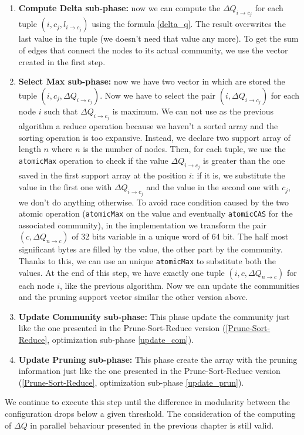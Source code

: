 \begin{enumerate}
	\item \textbf{Compute Delta sub-phase:} now we can compute the $\Delta Q_{i\rightarrow c_j}$ for each tuple $(i, c_j, l_{i \rightarrow c_j})$ using the formula \ref{delta_q}. The result overwrites the last value in the tuple (we doesn't need that value any more). To get the sum of edges that connect the nodes to its actual community, we use the vector created in the first step.
	\item \textbf{Select Max sub-phase:} now we have two vector in which are stored the tuple $(i, c_j, \Delta Q_{i\rightarrow c_j})$. Now we have to select the pair $(i, \Delta Q_{i\rightarrow c_j})$ for each node $i$ such that $\Delta Q_{i\rightarrow c_j}$ is maximum. We can not use as the previous algorithm a reduce operation because we haven't a sorted array and the sorting operation is too expansive. Instead, we declare two support array of length $n$ where $n$ is the number of nodes. Then, for each tuple, we use the \verb|atomicMax| operation to check if the value $\Delta Q_{i\rightarrow c_j}$ is greater than the one saved in the first support array at the position $i$: if it is, we substitute the value in the first one with $\Delta Q_{i\rightarrow c_j}$ and the value in the second one with $c_j$, we don't do anything otherwise. To avoid race condition caused by the two atomic operation (\verb|atomicMax| on the value and eventually \verb|atomicCAS| for the associated community), in the implementation we transform the pair $(c,\Delta Q_{n\rightarrow c})$ of 32 bits variable in a unique word of 64 bit. The half most significant bytes are filled by the value, the other part by the community. Thanks to this, we can use an unique \verb|atomicMax| to substitute both the values. At the end of this step, we have exactly one tuple  $(i, c, \Delta Q_{n\rightarrow c})$ for each node $i$, like the previous algorithm. Now we can update the communities and the pruning support vector similar the other version above.
	\item \textbf{Update Community sub-phase:} This phase update the community just like the one presented in the Prune-Sort-Reduce version (\ref{Prune-Sort-Reduce}, optimization sub-phase \ref{update_com}).
	\item \textbf{Update Pruning sub-phase:} This phase create the array with the pruning information just like the one presented in the Prune-Sort-Reduce version (\ref{Prune-Sort-Reduce}, optimization sub-phase \ref{update_prun}).
\end{enumerate}
We continue to execute this step until the difference in modularity between the configuration drops below a given threshold. The consideration of the computing of $\Delta Q$ in parallel behaviour presented in the previous chapter is still valid. \\
